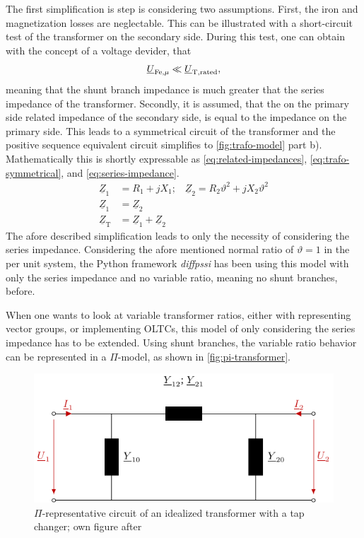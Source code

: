 The first simplification is step is considering two assumptions. 
First, the iron and magnetization losses are neglectable. 
This can be illustrated with a short-circuit test of the transformer on the secondary side. 
During this test, one can obtain with the concept of a voltage devider, that
\begin{align}
    \underline{U}_\mathrm{Fe, \mu} \ll \underline{U}_\mathrm{T,rated}, \notag
\end{align}
meaning that the shunt branch impedance is much greater that the series impedance of the transformer. 
Secondly, it is assumed, that the on the primary side related impedance of the secondary side, is equal to the impedance on the primary side. 
This leads to a symmetrical circuit of the transformer and the positive sequence equivalent circuit simplifies to \autoref{fig:trafo-model} part b). 
Mathematically this is shortly expressable as \autoref{eq:related-impedances}, \autoref{eq:trafo-symmetrical}, and \autoref{eq:series-impedance}. \autocite{machowski_2020,kundur_2022,milano_2010}
\begin{align}
    \underline{Z}_1 &= R_1 + jX_1\text{;}\quad\underline{Z}_2 = R_2 \vartheta^2 + jX_2 \vartheta^2 \label{eq:related-impedances} \\
    \underline{Z}_1 &= \underline{Z}_2 \label{eq:trafo-symmetrical} \\
    \underline{Z}_\mathrm{T} &= \underline{Z}_1 + \underline{Z}_2 \label{eq:series-impedance}
\end{align}
The afore described simplification leads to only the necessity of considering the series impedance. 
Considering the afore mentioned normal ratio of $\vartheta=1$ in the per unit system, the Python framework \textit{diffpssi} has been using this model with only the series impedance and no variable ratio, meaning no shunt branches, before.

When one wants to look at variable transformer ratios, either with representing vector groups, or implementing \acfp{OLTC}, this model of only considering the series impedance has to be extended. 
Using shunt branches, the variable ratio behavior can be represented in a $\Pi$-model, as shown in \autoref{fig:pi-transformer}. \autocite{machowski_2020,kundur_2022,milano_2010}

\begin{figure}%
    \centering
    \includegraphics[width=.7\textwidth]{tikz_graphics/images/transformer_pi.pdf}
    \caption[$\Pi$-representative circuit of an idealized transformer with a tap changer]{$\Pi$-representative circuit of an idealized transformer with a tap changer; own figure after \autocite{milano_2010,burlakin_2024}}
    \label{fig:pi-transformer}
\end{figure}

